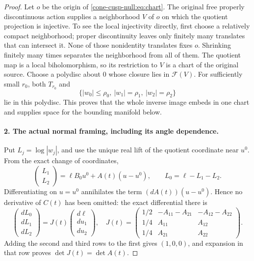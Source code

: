 \documentclass[11pt,letterpaper]{article}
\numberwithin{equation}{section}
\theoremstyle{definition}
\theoremstyle{remark}
\begin{document}
\begin{proof}
Let \(o\) be the origin of \eqref{cone-cusp-null:eq:chart}. The original free properly
discontinuous action supplies a neighborhood \(V\) of \(o\) on which
the quotient projection is injective. To see the local injectivity
directly, first choose a relatively compact neighborhood; proper
discontinuity leaves only finitely many translates that can intersect it.
None of those nonidentity translates fixes \(o\). Shrinking finitely
many times separates the neighborhood from all of them. The quotient
map is a local biholomorphism, so its restriction to \(V\) is a chart
of the original source.
Choose a polydisc about \(0\) whose closure lies in \(\mathcal F(V)\).
For sufficiently small \(r_0\), both \(T_{r_0}\) and
\begin{equation}
 \{|w_0|\leq\rho_0,\ |w_1|=\rho_1,\ |w_2|=\rho_2\}
 \label{cone-cusp-null:eq:spatial-bound}
\end{equation}
lie in this polydisc. This proves that the whole inverse image embeds
in one chart and supplies space for the bounding manifold below.

\paragraph{2. The actual normal framing, including its angle dependence.}
Put \(L_j=\log|w_j|\), and use the unique real lift of the quotient
coordinate near \(u^0\). From the exact change of coordinates,
\begin{equation}
 \begin{pmatrix}L_1\\L_2\end{pmatrix}
 =\ell B_0u^0+A(t)(u-u^0),\qquad
 L_0=\ell-L_1-L_2.
 \label{cone-cusp-null:eq:nearby-moduli}
\end{equation}
Differentiating on \(u=u^0\) annihilates the term
\((dA(t))(u-u^0)\). Hence no derivative of \(C(t)\) has been omitted:
the exact differential there is
\begin{equation}
 \begin{pmatrix}dL_0\\dL_1\\dL_2\end{pmatrix}
 =J(t)\begin{pmatrix}d\ell\\du_1\\du_2\end{pmatrix},\quad
 J(t)=
 \begin{pmatrix}
 1/2&-A_{11}-A_{21}&-A_{12}-A_{22}\\
 1/4&A_{11}&A_{12}\\
 1/4&A_{21}&A_{22}
 \end{pmatrix}.
 \label{cone-cusp-null:eq:J}
\end{equation}
Adding the second and third rows to the first gives \((1,0,0)\),
and expansion in that row proves \(\det J(t)=\det A(t)\).


\end{proof}
\end{document}
